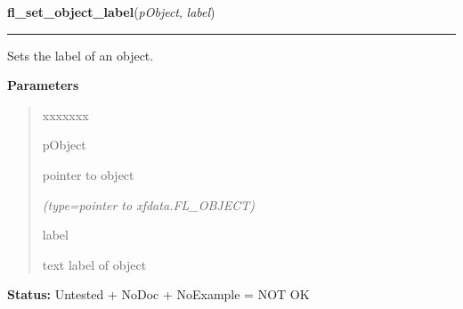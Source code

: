 \hspace{.8\funcindent}\begin{boxedminipage}{\funcwidth}

    \raggedright \textbf{fl\_set\_object\_label}(\textit{pObject}, \textit{label})

    \vspace{-1.5ex}

    \rule{\textwidth}{0.5\fboxrule}
\setlength{\parskip}{2ex}
    Sets the label of an object.

\setlength{\parskip}{1ex}
      \textbf{Parameters}
      \vspace{-1ex}

      \begin{quote}
        \begin{Ventry}{xxxxxxx}

          \item[pObject]

          pointer to object

            {\it (type=pointer to xfdata.FL\_OBJECT)}

          \item[label]

          text label of object

        \end{Ventry}

      \end{quote}

\textbf{Status:} Untested + NoDoc + NoExample = NOT OK



    \end{boxedminipage}

    \label{xformslib:library:fl_get_object_label}

    \vspace{0.5ex}


